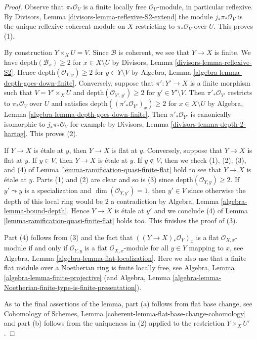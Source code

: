 \begin{proof}
Observe that $\pi_*\mathcal{O}_V$ is a finite locally free
$\mathcal{O}_U$-module, in particular reflexive.
By Divisors, Lemma \ref{divisors-lemma-reflexive-S2-extend}
the module $j_*\pi_*\mathcal{O}_V$ is the unique
reflexive coherent module on $X$ restricting to
$\pi_*\mathcal{O}_V$ over $U$. This proves (1).

\medskip\noindent
By construction $Y \times_X U = V$.
Since $\mathcal{B}$ is coherent, we see that $Y \to X$ is finite.
We have $\text{depth}(\mathcal{B}_x) \geq 2$ for $x \in X \setminus U$
by Divisors, Lemma \ref{divisors-lemma-reflexive-S2}.
Hence $\text{depth}(\mathcal{O}_{Y, y}) \geq 2$ for $y \in Y \setminus V$
by Algebra, Lemma \ref{algebra-lemma-depth-goes-down-finite}.
Conversely, suppose that $\pi' : Y' \to X$ is a finite morphism such that
$V = Y' \times_X U$ and $\text{depth}(\mathcal{O}_{Y', y'}) \geq 2$
for $y' \in Y' \setminus V$. Then $\pi'_*\mathcal{O}_{Y'}$
restricts to $\pi_*\mathcal{O}_V$ over $U$ and satisfies
$\text{depth}((\pi'_*\mathcal{O}_{Y'})_x) \geq 2$ for
$x \in X \setminus U$ by
Algebra, Lemma \ref{algebra-lemma-depth-goes-down-finite}.
Then $\pi'_*\mathcal{O}_{Y'}$ is canonically isomorphic
to $j_*\pi_*\mathcal{O}_V$ for example by
Divisors, Lemma \ref{divisors-lemma-depth-2-hartog}.
This proves (2).

\medskip\noindent
If $Y \to X$ is \'etale at $y$, then $Y \to X$ is flat at $y$.
Conversely, suppose that $Y \to X$ is flat at $y$.
If $y \in V$, then $Y \to X$ is \'etale at $y$.
If $y \not \in V$, then we check (1), (2), (3), and (4) of
Lemma \ref{lemma-ramification-quasi-finite-flat} hold
to see that $Y \to X$ is \'etale at $y$. Parts (1) and (2)
are clear and so is (3) since $\text{depth}(\mathcal{O}_{Y, y}) \geq 2$.
If $y' \leadsto y$ is a specialization and $\dim(\mathcal{O}_{Y, y'}) = 1$,
then $y' \in V$ since otherwise the depth of this local ring
would be $2$ a contradiction by
Algebra, Lemma \ref{algebra-lemma-bound-depth}.
Hence $Y \to X$ is \'etale at $y'$ and we conclude (4) of
Lemma \ref{lemma-ramification-quasi-finite-flat} holds too.
This finishes the proof of (3).

\medskip\noindent
Part (4) follows from (3) and the fact that $((Y \to X)_*\mathcal{O}_Y)_x$
is a flat $\mathcal{O}_{X, x}$-module if and only if $\mathcal{O}_{Y, y}$
is a flat $\mathcal{O}_{X, x}$-module for all $y \in Y$ mapping to $x$, see
Algebra, Lemma \ref{algebra-lemma-flat-localization}. Here we also
use that a finite flat module over a Noetherian ring is finite locally
free, see Algebra, Lemma \ref{algebra-lemma-finite-projective}
(and
Algebra, Lemma
\ref{algebra-lemma-Noetherian-finite-type-is-finite-presentation}).

\medskip\noindent
As to the final assertions of the lemma, part (a) follows from
flat base change, see
Cohomology of Schemes, Lemma \ref{coherent-lemma-flat-base-change-cohomology}
and part (b) follows from the uniqueness in (2) applied to the restriction
$Y \times_X U'$.
\end{proof}

